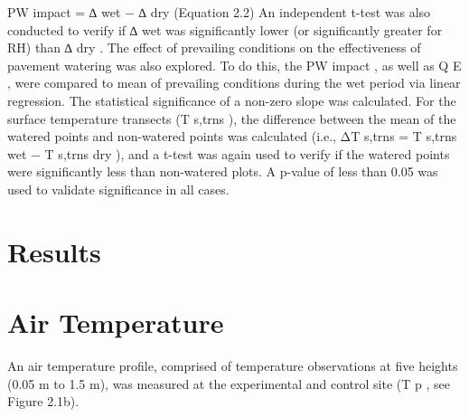 \documentclass[final,3p,times,authoryear]{elsarticle}
\begin{document}
PW impact = ∆ wet − ∆ dry
(Equation 2.2)
An independent t-test was also conducted to verify if ∆ wet was significantly lower (or
significantly greater for RH) than ∆ dry .
The effect of prevailing conditions on the effectiveness of pavement watering was also
explored. To do this, the PW impact , as well as Q E , were compared to mean of prevailing
conditions during the wet period via linear regression. The statistical significance of a
non-zero slope was calculated.
For the surface temperature transects (T s,trns ), the difference between the mean of the
watered points and non-watered points was calculated (i.e., ΔT s,trns = T s,trns wet −
T s,trns dry ), and a t-test was again used to verify if the watered points were significantly
less than non-watered plots.
A p-value of less than 0.05 was used to validate significance in all cases.

\section{Results}\label{sec:discussion3}
\section{Air Temperature}\label{sec:discussion3.1}

An air temperature profile, comprised of temperature observations at five heights (0.05
m to 1.5 m), was measured at the experimental and control site (T p , see Figure 2.1b).
\end{document}

